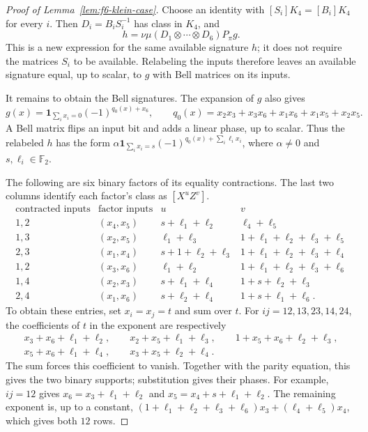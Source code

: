 \begin{proof}[Proof of Lemma~\ref{lem:f6-klein-case}]
Choose an identity with $[S_i]K_4=[B_i]K_4$ for every $i$.
Then $D_i=B_iS_i^{-1}$ has class in $K_4$, and
\[
h=\nu\mu(D_1\otimes\cdots\otimes D_6)P_\pi g.
\]
This is a new expression for the same available signature $h$;
it does not require the matrices $S_i$ to be available.
Relabeling the inputs therefore leaves an available signature
equal, up to scalar, to $g$ with Bell matrices on its inputs.

It remains to obtain the Bell signatures.
The expansion of $g$ also gives
\[
g(x)=\mathbf1_{\sum_i x_i=0}(-1)^{q_0(x)+x_6},
\qquad
q_0(x)=x_2x_3+x_3x_6+x_1x_6+x_1x_5+x_2x_5.
\]
A Bell matrix flips an input bit and adds a linear phase,
up to scalar. Thus the relabeled $h$ has the form
$\alpha\mathbf1_{\sum_i x_i=s}
(-1)^{q_0(x)+\sum_i\ell_i x_i}$,
where $\alpha\ne0$ and $s,\ell_i\in\mathbb F_2$.

The following are six binary factors of its equality contractions.
The last two columns identify each factor's class as $[X^uZ^v]$.
\[
\begin{array}{c|c|cc}
\text{contracted inputs}&\text{factor inputs}&u&v\\ \hline
1,2&(x_4,x_5)&s+\ell_1+\ell_2&\ell_4+\ell_5\\
1,3&(x_2,x_5)&\ell_1+\ell_3&
1+\ell_1+\ell_2+\ell_3+\ell_5\\
2,3&(x_1,x_4)&s+1+\ell_2+\ell_3&
1+\ell_1+\ell_2+\ell_3+\ell_4\\ \hline
1,2&(x_3,x_6)&\ell_1+\ell_2&
1+\ell_1+\ell_2+\ell_3+\ell_6\\
1,4&(x_2,x_3)&s+\ell_1+\ell_4&
1+s+\ell_2+\ell_3\\
2,4&(x_1,x_6)&s+\ell_2+\ell_4&
1+s+\ell_1+\ell_6.
\end{array}
\]
To obtain these entries, set $x_i=x_j=t$ and sum over $t$.
For $ij=12,13,23,14,24$, the coefficients of $t$ in the exponent
are respectively
\[
\begin{gathered}
x_3+x_6+\ell_1+\ell_2,\qquad
x_2+x_5+\ell_1+\ell_3,\qquad
1+x_5+x_6+\ell_2+\ell_3,\\
x_5+x_6+\ell_1+\ell_4,\qquad
x_3+x_5+\ell_2+\ell_4.
\end{gathered}
\]
The sum forces this coefficient to vanish.
Together with the parity equation, this gives the two binary
supports; substitution gives their phases.
For example, $ij=12$ gives
$x_6=x_3+\ell_1+\ell_2$ and
$x_5=x_4+s+\ell_1+\ell_2$.
The remaining exponent is, up to a constant,
$(1+\ell_1+\ell_2+\ell_3+\ell_6)x_3
+(\ell_4+\ell_5)x_4$,
which gives both $12$ rows.


\end{proof}

